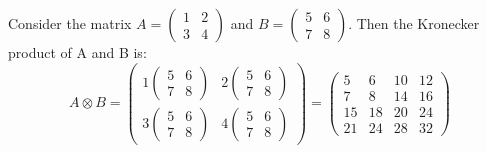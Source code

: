 \begin{example}
    Consider the matrix $A=\begin{pmatrix} 1 & 2 \\ 3 & 4 \end{pmatrix}$ and $B=\begin{pmatrix} 5 & 6 \\ 7 & 8 \end{pmatrix}$. Then the Kronecker product of A and B is:
    \[ A \otimes B = \begin{pmatrix} 1 \begin{pmatrix} 5 & 6 \\ 7 & 8 \end{pmatrix} & 2 \begin{pmatrix} 5 & 6 \\ 7 & 8 \end{pmatrix} \\ 3 \begin{pmatrix} 5 & 6 \\ 7 & 8 \end{pmatrix} & 4 \begin{pmatrix} 5 & 6 \\ 7 & 8 \end{pmatrix} \end{pmatrix} = \begin{pmatrix} 5 & 6 & 10 & 12 \\ 7 & 8 & 14 & 16 \\ 15 & 18 & 20 & 24 \\ 21 & 24 & 28 & 32 \end{pmatrix} \]
\end{example}

